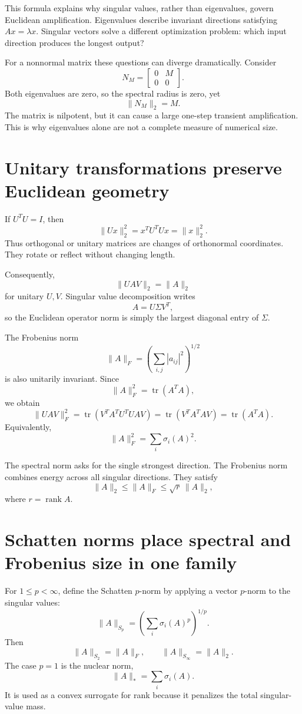 This formula explains why singular values, rather than eigenvalues, govern Euclidean amplification.  Eigenvalues describe invariant directions satisfying \(Ax=\lambda x\).  Singular vectors solve a different optimization problem: which input direction produces the longest output?

For a nonnormal matrix these questions can diverge dramatically.  Consider
\[
  N_M=
  \begin{bmatrix}
    0&M\\
    0&0
  \end{bmatrix}.
\]
Both eigenvalues are zero, so the spectral radius is zero, yet
\[
  \|N_M\|_2=M.
\]
The matrix is nilpotent, but it can cause a large one-step transient amplification.  This is why eigenvalues alone are not a complete measure of numerical size.

\section{Unitary transformations preserve Euclidean geometry}

If \(U^TU=I\), then
\[
  \|Ux\|_2^2=x^TU^TUx=\|x\|_2^2.
\]
Thus orthogonal or unitary matrices are changes of orthonormal coordinates.  They rotate or reflect without changing length.

Consequently,
\[
  \|UAV\|_2=\|A\|_2
\]
for unitary \(U,V\).  Singular value decomposition writes
\[
  A=U\Sigma V^T,
\]
so the Euclidean operator norm is simply the largest diagonal entry of \(\Sigma\).

The Frobenius norm
\[
  \|A\|_F=\left(\sum_{i,j}|a_{ij}|^2\right)^{1/2}
\]
is also unitarily invariant.  Since
\[
  \|A\|_F^2=\operatorname{tr}(A^TA),
\]
we obtain
\[
  \|UAV\|_F^2
  =\operatorname{tr}(V^TA^TU^TUAV)
  =\operatorname{tr}(V^TA^TAV)
  =\operatorname{tr}(A^TA).
\]
Equivalently,
\[
  \|A\|_F^2=\sum_i\sigma_i(A)^2.
\]

The spectral norm asks for the single strongest direction.  The Frobenius norm combines energy across all singular directions.  They satisfy
\[
  \|A\|_2\le \|A\|_F\le \sqrt{r}\,\|A\|_2,
\]
where \(r=\operatorname{rank}A\).

\section{Schatten norms place spectral and Frobenius size in one family}

For \(1\le p<\infty\), define the Schatten \(p\)-norm by applying a vector \(p\)-norm to the singular values:
\[
  \|A\|_{S_p}
  =\left(\sum_i\sigma_i(A)^p\right)^{1/p}.
\]
Then
\[
  \|A\|_{S_2}=\|A\|_F,
  \qquad
  \|A\|_{S_\infty}=\|A\|_2.
\]
The case \(p=1\) is the nuclear norm,
\[
  \|A\|_*=\sum_i\sigma_i(A).
\]
It is used as a convex surrogate for rank because it penalizes the total singular-value mass.

